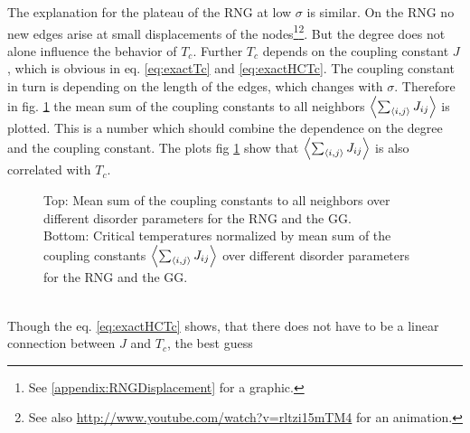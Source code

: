     The explanation for the plateau of the RNG at low \(\sigma\) is similar.
    On the RNG no new edges arise at small displacements of the nodes\footnote{See \ref{appendix:RNGDisplacement} for a graphic.}\footnote{See also \url{http://www.youtube.com/watch?v=rltzi15mTM4} for an animation.}.
    But the degree does not alone influence the behavior of \(T_c\).
    Further \(T_c\) depends on the coupling constant \(J\), which is
    obvious in eq. \eqref{eq:exactTc} and \eqref{eq:exactHCTc}. The
    coupling constant in turn is depending on the length of the edges,
    which changes with \(\sigma\).
    Therefore  in fig. \ref{fig:TcJ}
    the mean sum of the coupling constants to all neighbors \(\left< \sum_{\left< i,j \right>} J_{ij} \right>\)
    is plotted. This is a number which should combine the dependence on
    the degree and the coupling constant.
    The plots fig \ref{fig:TcJ}
    show that \(\left< \sum_{\left< i,j \right>} J_{ij} \right>\) is also correlated with \(T_c\).
    \begin{figure}[htbp]
        \centering


        \caption[Critical Temperature normalized by Mean Sum of the Coupling Constants]
        {
            Top: Mean sum of the coupling constants to all
            neighbors over different disorder parameters for
             the RNG and
             the GG.\\
            Bottom: Critical temperatures normalized by mean sum of the
            coupling constants \(\left< \sum_{\left< i,j \right>} J_{ij} \right>\) over different
            disorder parameters for
             the RNG and
             the GG.
        }
        \label{fig:TcJ}
    \end{figure}\\
    Though the eq. \eqref{eq:exactHCTc} shows, that there does not have
    to be a linear connection between \(J\) and \(T_c\), the best guess
